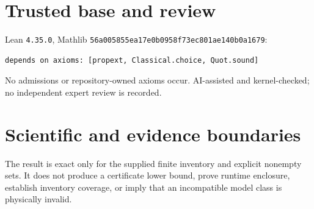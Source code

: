 \documentclass[11pt]{article}
\begin{document}
\section{Trusted base and review}
Lean \texttt{4.35.0}, Mathlib
\texttt{56a005855ea17e0b0958f73ec801ae140b0a1679}:
\begin{lstlisting}
depends on axioms: [propext, Classical.choice, Quot.sound]
\end{lstlisting}
No admissions or repository-owned axioms occur. AI-assisted and kernel-checked; no
independent expert review is recorded.
\section{Scientific and evidence boundaries}
The result is exact only for the supplied finite inventory and explicit nonempty sets. It
does not produce a certificate lower bound, prove runtime enclosure, establish inventory
coverage, or imply that an incompatible model class is physically invalid.
\end{document}
